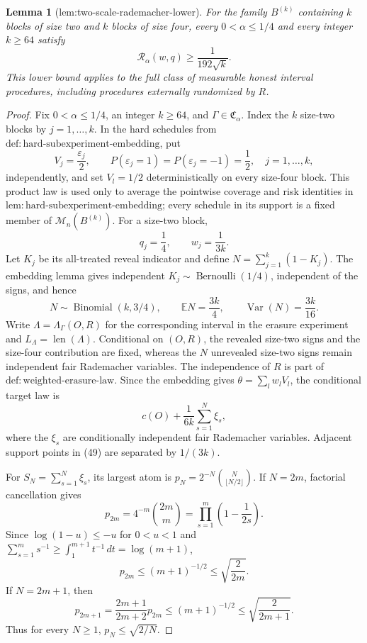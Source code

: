 \documentclass{article}
\newtheorem{lemma}{Lemma}
\begin{document}
\begin{lemma}[lem:two-scale-rademacher-lower]\label{lem:two-scale-rademacher-lower}
For the family \(B^{(k)}\) containing \(k\) blocks of size two and \(k\) blocks of size four, every \(0<\alpha\le1/4\) and every integer \(k\ge64\) satisfy
\[
 \mathcal R_\alpha(w,q)\ge\frac{1}{192\sqrt{k}}.
\]
This lower bound applies to the full class of measurable honest interval procedures, including procedures externally randomized by \(R\).
\end{lemma}
\begin{proof}
Fix \(0<\alpha\le1/4\), an integer \(k\ge64\), and \(\Gamma\in\mathfrak C_\alpha\). Index the \(k\) size-two blocks by \(j=1,\ldots,k\). In the hard schedules from \(\mathrm{def{:}hard\text{-}subexperiment\text{-}embedding}\), put
\[
 V_j=\frac{\varepsilon_j}{2},\qquad
 P(\varepsilon_j=1)=P(\varepsilon_j=-1)=\frac12,
 \quad j=1,\ldots,k,
\tag{46}
\]
independently, and set \(V_l=1/2\) deterministically on every size-four block. This product law is used only to average the pointwise coverage and risk identities in \(\mathrm{lem{:}hard\text{-}subexperiment\text{-}embedding}\); every schedule in its support is a fixed member of \(\mathcal M_n(B^{(k)})\). For a size-two block,
\[
 q_j=\frac14,\qquad w_j=\frac1{3k}.
\tag{47}
\]
Let \(K_j\) be its all-treated reveal indicator and define \(N=\sum_{j=1}^k(1-K_j)\). The embedding lemma gives independent \(K_j\sim\operatorname{Bernoulli}(1/4)\), independent of the signs, and hence
\[
 N\sim\operatorname{Binomial}(k,3/4),\qquad
 \mathbb EN=\frac{3k}{4},\qquad
 \operatorname{Var}(N)=\frac{3k}{16}.
\tag{48}
\]
Write \(\Lambda=\Lambda_\Gamma(O,R)\) for the corresponding interval in the erasure experiment and \(L_\Lambda=\operatorname{len}(\Lambda)\). Conditional on \((O,R)\), the revealed size-two signs and the size-four contribution are fixed, whereas the \(N\) unrevealed size-two signs remain independent fair Rademacher variables. The independence of \(R\) is part of \(\mathrm{def{:}weighted\text{-}erasure\text{-}law}\). Since the embedding gives \(\theta=\sum_lw_lV_l\), the conditional target law is
\[
 c(O)+\frac1{6k}\sum_{s=1}^{N}\xi_s,
\tag{49}
\]
where the \(\xi_s\) are conditionally independent fair Rademacher variables. Adjacent support points in (49) are separated by \(1/(3k)\).

For \(S_N=\sum_{s=1}^N\xi_s\), its largest atom is \(p_N=2^{-N}\binom{N}{\lfloor N/2\rfloor}\). If \(N=2m\), factorial cancellation gives
\[
 p_{2m}=4^{-m}\binom{2m}{m}
       =\prod_{s=1}^m\left(1-\frac1{2s}\right).
\]
Since \(\log(1-u)\le-u\) for \(0<u<1\) and \(\sum_{s=1}^m s^{-1}\ge\int_1^{m+1}t^{-1}\,dt=\log(m+1)\),
\[
 p_{2m}\le(m+1)^{-1/2}\le\sqrt{\frac2{2m}}.
\tag{50}
\]
If \(N=2m+1\), then
\[
 p_{2m+1}=\frac{2m+1}{2m+2}p_{2m}
 \le(m+1)^{-1/2}
 \le\sqrt{\frac2{2m+1}}.
\tag{51}
\]
Thus for every \(N\ge1\), \(p_N\le\sqrt{2/N}\).


\end{proof}
\end{document}
